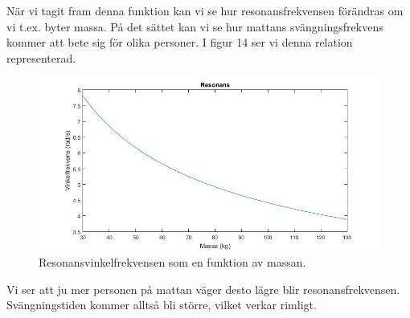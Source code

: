 \documentclass[10pt,a4paper]{article}
\begin{document}
När vi tagit fram denna funktion kan vi se hur resonansfrekvensen förändras om vi t.ex. byter massa. På det sättet kan vi se hur mattans svängningsfrekvens kommer att bete sig för olika personer. I figur 14 ser vi denna relation representerad.

\begin{figure}[h]
\begin{center}
\includegraphics[scale=0.4]{resonans}
\caption{Resonansvinkelfrekvensen som en funktion av massan.}
\end{center}
\end{figure}

Vi ser att ju mer personen på mattan väger desto lägre blir resonansfrekvensen. Svängningstiden kommer alltså bli större, vilket verkar rimligt.\newline
\end{document}
